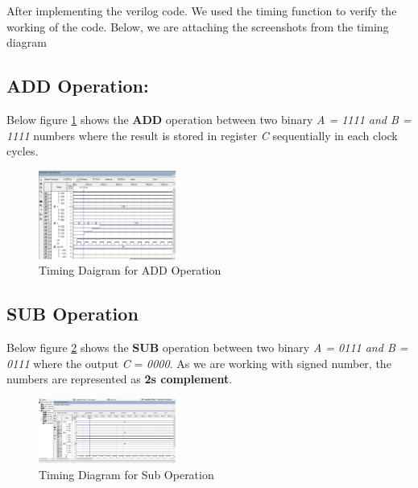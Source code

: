 After implementing the verilog code.
We used the timing function to verify the working of the code.
Below, we are attaching the screenshots from the timing diagram

\subsection{ADD Operation:}\label{subsec:add-operation}
Below figure \ref{fig:timing add} shows the \textbf{ADD} operation between two binary \textit{A = 1111 and B = 1111} numbers
where the result is stored in register \textit{C} sequentially in each clock cycles.
\begin{figure}[H]
    \begin{center}
        \includegraphics[width = 0.4\textwidth]{figures/add}
    \end{center}
    \caption{Timing Daigram for ADD Operation}
    \label{fig:timing add}
\end{figure}

\subsection{SUB Operation}\label{subsec:sub-operation}
Below figure \ref{fig:timing sub} shows the \textbf{SUB} operation between two binary \textit{A = 0111 and B = 0111} where the output \textit{C} = \textit{0000}.
As we are working with signed number, the numbers are represented as \textbf{2s complement}.

\begin{figure}[H]
    \begin{center}
        \includegraphics[width = 0.4\textwidth]{figures/sub_operation}
    \end{center}
    \caption{Timing Diagram for Sub Operation}
    \label{fig:timing sub}
\end{figure}

